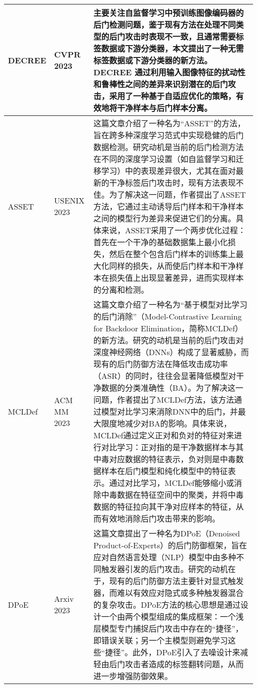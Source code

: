 \documentclass[lettersize,journal]{IEEEtran}
\begin{document}
\begin{longtable}{|p{3.5cm}|p{2cm}|p{10.5cm}|}
    DECREE\cite{feng2023detecting} & CVPR 2023 & 主要关注自监督学习中预训练图像编码器的后门检测问题，鉴于现有方法在处理不同类型的后门攻击时表现不一致，且通常需要标签数据或下游分类器，本文提出了一种无需标签数据或下游分类器的新方法。DECREE 通过利用输入图像特征的扰动性和鲁棒性之间的差异来识别潜在的后门攻击，采用了一种基于自适应优化的策略，有效地将干净样本与后门样本分离。 \\ \hline
  
    ASSET\cite{pan2023asset} & USENIX 2023 & 这篇文章介绍了一种名为“ASSET”的方法，旨在跨多种深度学习范式中实现稳健的后门数据检测。研究动机是当前的后门检测方法在不同的深度学习设置（如自监督学习和迁移学习）中的表现差异很大，尤其在面对最新的干净标签后门攻击时，现有方法表现不佳。为了解决这一问题，作者提出了ASSET方法，它通过主动诱导后门样本和干净样本之间的模型行为差异来促进它们的分离。具体来说，ASSET采用了一个两步优化过程：首先在一个干净的基础数据集上最小化损失，然后在整个包含后门样本的训练集上最大化同样的损失，从而使后门样本和干净样本在损失值上出现显著差异，进而实现样本的分离和检测。\\ \hline

    MCLDef\cite{yue2023model} & ACM MM 2023 & 这篇文章介绍了一种名为“基于模型对比学习的后门消除”（Model-Contrastive Learning for Backdoor Elimination，简称MCLDef）的新方法。研究的动机是当前的后门攻击对深度神经网络（DNNs）构成了显著威胁，而现有的后门防御方法在降低攻击成功率（ASR）的同时，往往会显著降低模型对干净数据的分类准确性（BA）。为了解决这一问题，作者提出了MCLDef方法，该方法通过模型对比学习来消除DNN中的后门，并最大限度地减少对BA的影响。具体来说，MCLDef通过定义正对和负对的特征对来进行对比学习：正对指的是干净数据样本与其中毒对应数据的特征表示，负对则是中毒数据样本在后门模型和纯化模型中的特征表示。通过对比学习，MCLDef能够缩小或消除中毒数据在特征空间中的聚类，并将中毒数据的特征拉向其干净对应样本的特征，从而有效地消除后门攻击带来的影响。 \\ \hline

    DPoE\cite{liu2023shortcuts} & Arxiv 2023 & 这篇文章提出了一种名为DPoE（Denoised Product-of-Experts）的后门防御框架，旨在应对自然语言处理（NLP）模型中由多种不同触发器引发的后门攻击。研究的动机在于，现有的后门防御方法主要针对显式触发器，而难以有效应对隐式或多种触发器混合的复杂攻击。DPoE方法的核心思想是通过设计一个由两个模型组成的集成框架：一个浅层模型专门捕捉后门攻击中存在的“捷径”，即错误关联；另一个主模型则避免学习这些“捷径”。此外，DPoE引入了去噪设计来减轻由后门攻击者造成的标签翻转问题，从而进一步增强防御效果。 \\ \hline


\end{longtable}
\end{document}
